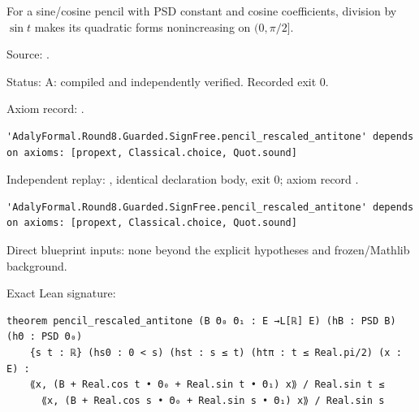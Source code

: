 \begin{theorem}[bp-072]
\label{bp-072}
\uses{}
\leanok
For a sine/cosine pencil with PSD constant and cosine coefficients, division by \(\sin t\) makes its quadratic forms nonincreasing on \((0,\pi/2]\).

\par Source: \texttt{}.
\par Status: A: compiled and independently verified. Recorded exit 0.
\par Axiom record: \texttt{}.
\begin{verbatim}
'AdalyFormal.Round8.Guarded.SignFree.pencil_rescaled_antitone' depends on axioms: [propext, Classical.choice, Quot.sound]
\end{verbatim}
\par Independent replay: \texttt{}, identical declaration body, exit 0; axiom record \texttt{}.
\begin{verbatim}
'AdalyFormal.Round8.Guarded.SignFree.pencil_rescaled_antitone' depends on axioms: [propext, Classical.choice, Quot.sound]
\end{verbatim}
\par Direct blueprint inputs: none beyond the explicit hypotheses and frozen/Mathlib background.
\par Exact Lean signature:
\begin{verbatim}
theorem pencil_rescaled_antitone (B Θ₀ Θ₁ : E →L[ℝ] E) (hB : PSD B) (hΘ : PSD Θ₀)
    {s t : ℝ} (hs0 : 0 < s) (hst : s ≤ t) (htπ : t ≤ Real.pi/2) (x : E) :
    ⟪x, (B + Real.cos t • Θ₀ + Real.sin t • Θ₁) x⟫ / Real.sin t ≤
      ⟪x, (B + Real.cos s • Θ₀ + Real.sin s • Θ₁) x⟫ / Real.sin s
\end{verbatim}
\end{theorem}

